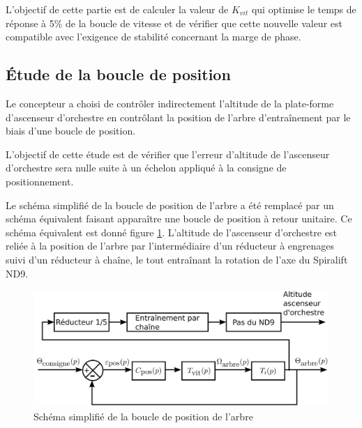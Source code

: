 L'objectif de cette partie est de calculer la valeur de $K_{vit}$ qui optimise le temps de réponse à 5\% de la boucle de vitesse et de vérifier que cette nouvelle valeur est compatible avec l'exigence de stabilité concernant la marge de phase.


%
%
%

\subsection{Étude de la boucle de position}

Le concepteur a choisi de contrôler indirectement l'altitude de la plate-forme d'ascenseur d'orchestre en contrôlant la position de l'arbre d'entraînement par le biais d'une boucle de position.

L'objectif de cette étude est de vérifier que l'erreur d'altitude de l'ascenseur d'orchestre sera nulle suite à un échelon appliqué à la consigne de positionnement.

Le schéma simplifié de la boucle de position de l'arbre a été remplacé par un schéma équivalent faisant apparaître une boucle de position à retour unitaire. Ce schéma équivalent est donné figure \ref{fig22}. L'altitude de l'ascenseur d'orchestre est reliée à la position de l'arbre par l'intermédiaire d'un réducteur à engrenages suivi d'un réducteur à chaîne, le tout entraînant la rotation de l'axe du Spiralift ND9.

\begin{figure}[!h]
 \centering\includegraphics[width=0.7\linewidth]{img/fig22}
 \caption{Schéma simplifié de la boucle de position de l'arbre}
 \label{fig22}
\end{figure}

